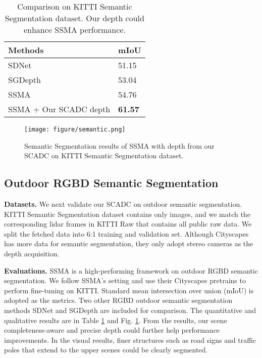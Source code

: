 \documentclass{article}
\begin{document}
\begin{table}[bt!]
\begin{center}
\caption{Comparison on KITTI Semantic Segmentation dataset. Our depth could enhance SSMA performance.}
\footnotesize
\label{table:semantic}
\begin{tabular}{|p{4.0cm}<{\centering}||p{1cm}<{\centering}|}
\hline
Methods & mIoU \\
\hline
SDNet \cite{ochs2019sdnet}& 51.15 \\
SGDepth \cite{klingner2020self} & 53.04 \\
SSMA \cite{valada19ijcv}& 54.76\\
SSMA + Our SCADC depth & \textbf{61.57} \\
\hline
\end{tabular}
\vspace{-20pt}
\end{center}
\end{table}

\begin{figure}[hbt!]
    \centering
    \texttt{[image: figure/semantic.png]}
    \vspace{-10pt}
    \caption{Semantic Segmentation results of SSMA with depth from our SCADC on KITTI Semantic Segmentation dataset.}
    \label{semantic}
    \vspace{-10pt}
\end{figure}

\vspace{-10pt}
\subsection{Outdoor RGBD Semantic Segmentation}
\vspace{-5pt}
\textbf{Datasets.} We next validate our SCADC on outdoor semantic segmentation. KITTI Semantic Segmentation dataset contains only images, and we match the corresponding lidar frames in KITTI Raw that contains all public raw data. We split the fetched data into 6:1 training and validation set. Although Cityscapes has more data for semantic segmentation, they only adopt stereo cameras as the depth acquisition.



\textbf{Evaluations.} SSMA \cite{valada19ijcv} is a high-performing framework on outdoor RGBD semantic segmentation. We follow SSMA's setting and use their Cityscapes pretrains to perform fine-tuning on KITTI. Standard mean intersection over union (mIoU) is adopted as the metrics. Two other RGBD outdoor semantic segmentation methods SDNet \cite{ochs2019sdnet} and SGDepth \cite{klingner2020self} are included for comparison. The quantitative and qualitative results are in Table \ref{table:semantic} and Fig. \ref{semantic}. From the results, our scene completeness-aware and precise depth could further help performance improvements. In the visual results, finer structures such as road signs and traffic poles that extend to the upper scenes could be clearly segmented.
\end{document}
